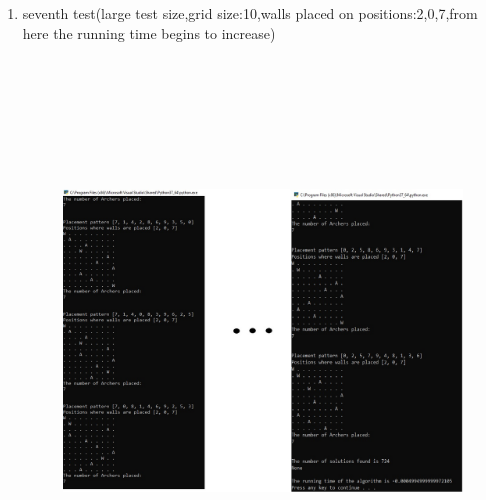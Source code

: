 \documentclass{article}
\begin{document}
\begin{enumerate}
\newpage
\item seventh test(large test size,grid size:10,walls placed on positions:2,0,7,from here the running time begins to increase)
\begin{figure}[h]
\includegraphics[width=12 cm, height=15cm]{test7}
\end{figure}


\end{enumerate}
\end{document}
